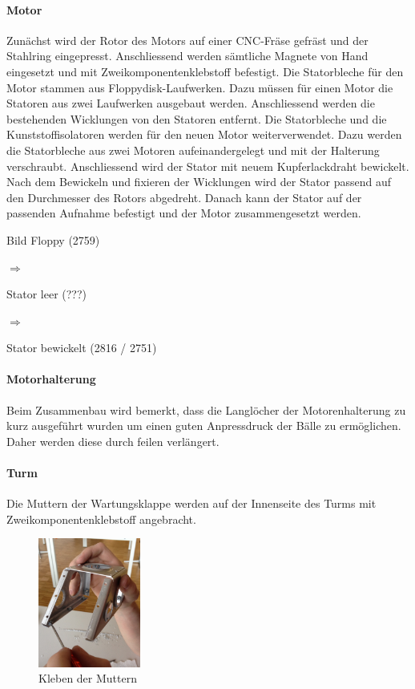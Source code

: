 \paragraph{Motor}
Zunächst wird der Rotor des Motors auf einer CNC-Fräse gefräst und der 
Stahlring eingepresst. Anschliessend werden sämtliche Magnete von Hand 
eingesetzt und mit Zweikomponentenklebstoff befestigt. Die Statorbleche für 
den Motor stammen aus Floppydisk-Laufwerken. Dazu müssen für einen Motor die 
Statoren aus zwei Laufwerken ausgebaut werden. Anschliessend werden die 
bestehenden Wicklungen von den Statoren entfernt. Die Statorbleche und die 
Kunststoffisolatoren werden für den neuen Motor weiterverwendet. Dazu werden 
die Statorbleche aus zwei Motoren aufeinandergelegt und mit der Halterung 
verschraubt. Anschliessend wird der Stator mit neuem Kupferlackdraht 
bewickelt. Nach dem Bewickeln und fixieren der Wicklungen wird der Stator 
passend auf den Durchmesser des Rotors abgedreht. Danach kann der Stator auf 
der passenden Aufnahme befestigt und der Motor zusammengesetzt werden. 
\begin{center}
    \begin{minipage}[c]{0.2\textwidth}
        Bild Floppy (2759)
    \end{minipage}
    \begin{minipage}[c]{0.1\textwidth}
        \Huge$\Rightarrow$
    \end{minipage}
    \begin{minipage}[c]{0.2\textwidth}
        Stator leer (???)
    \end{minipage}
    \begin{minipage}[c]{0.1\textwidth}
        \Huge$\Rightarrow$
    \end{minipage}
    \begin{minipage}[c]{0.2\textwidth}
        Stator bewickelt (2816 / 2751)
    \end{minipage}
\end{center}

\paragraph{Motorhalterung}
Beim Zusammenbau wird bemerkt, dass die Langlöcher der Motorenhalterung zu kurz ausgeführt wurden um einen guten Anpressdruck der Bälle zu ermöglichen. Daher werden diese durch feilen verlängert.

\paragraph{Turm}
Die Muttern der Wartungsklappe werden auf der Innenseite des Turms mit Zweikomponentenklebstoff 
angebracht. 

\begin{figure}[h!]          
	\centering             
	\includegraphics[width=0.3\textwidth]{fig/IMG_2292.JPG}
	\caption{Kleben der Muttern}
	\label{fig:Muttern Kleben}        
\end{figure}


